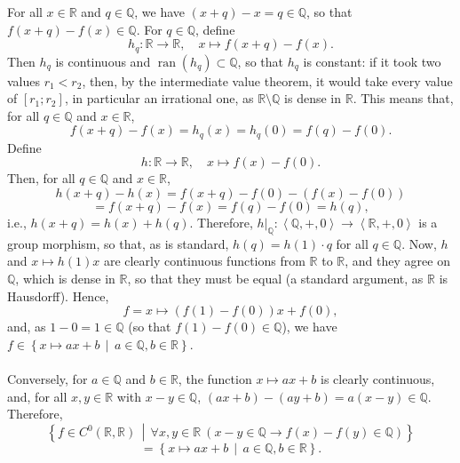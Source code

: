 \begin{solution}
    For all \( x \in \mathbb{R} \) and \( q \in \mathbb{Q} \), we have \( \left(x+q\right)-x = q \in \mathbb{Q} \), so that \( f\left(x+q\right)-f\left(x\right) \in \mathbb{Q} \). For \( q \in \mathbb{Q} \), define
    \[
        h_q \colon \mathbb{R} \longrightarrow \mathbb{R}, \quad x \longmapsto f\left(x+q\right)-f\left(x\right).
    \]
    Then \( h_q \) is continuous and \( \operatorname{ran}\left(h_q\right) \subset \mathbb{Q} \), so that \( h_q \) is constant: if it took two values \( r_1 < r_2 \), then, by the intermediate value theorem, it would take every value of \( \left[r_1;r_2\right] \), in particular an irrational one, as \( \mathbb{R} \setminus \mathbb{Q} \) is dense in \( \mathbb{R} \). This means that, for all \( q \in \mathbb{Q} \) and \( x \in \mathbb{R} \),
    \[
        f\left(x+q\right)-f\left(x\right) = h_q\left(x\right) = h_q\left(0\right) = f\left(q\right)-f\left(0\right).
    \]
    Define
    \[
        h \colon \mathbb{R} \longrightarrow \mathbb{R}, \quad x \longmapsto f\left(x\right)-f\left(0\right).
    \]
    Then, for all \( q \in \mathbb{Q} \) and \( x \in \mathbb{R} \),
    \[
        h\left(x+q\right)-h\left(x\right) = f\left(x+q\right)-f\left(0\right)-\left(f\left(x\right)-f\left(0\right)\right)
    \]
    \[
        = f\left(x+q\right)-f\left(x\right) = f\left(q\right)-f\left(0\right) = h\left(q\right),
    \]
    i.e., \( h\left(x+q\right) = h\left(x\right)+h\left(q\right) \). Therefore, \( h|_{\mathbb{Q}} \colon \left\langle \mathbb{Q},+,0 \right\rangle \longrightarrow \left\langle \mathbb{R},+,0 \right\rangle \) is a group morphism, so that, as is standard, \( h\left(q\right) = h\left(1\right) \cdot q \) for all \( q \in \mathbb{Q} \). Now, \( h \) and \( x \mapsto h\left(1\right)x \) are clearly continuous functions from \( \mathbb{R} \) to \( \mathbb{R} \), and they agree on \( \mathbb{Q} \), which is dense in \( \mathbb{R} \), so that they must be equal (a standard argument, as \( \mathbb{R} \) is Hausdorff). Hence,
    \[
        f = x \longmapsto \left(f\left(1\right)-f\left(0\right)\right)x+f\left(0\right),
    \]
    and, as \( 1-0 = 1 \in \mathbb{Q} \) (so that \( f\left(1\right)-f\left(0\right) \in \mathbb{Q} \)), we have \( f \in \left\{ x \mapsto ax+b \,\middle|\, a \in \mathbb{Q}, b \in \mathbb{R} \right\} \).
    \\\\
    Conversely, for \( a \in \mathbb{Q} \) and \( b \in \mathbb{R} \), the function \( x \mapsto ax+b \) is clearly continuous, and, for all \( x, y \in \mathbb{R} \) with \( x-y \in \mathbb{Q} \), \( \left(ax+b\right)-\left(ay+b\right) = a\left(x-y\right) \in \mathbb{Q} \). Therefore,
    \[
        \left\{ f \in C^0\left(\mathbb{R},\mathbb{R}\right) \,\middle|\, \forall x, y \in \mathbb{R} \ \left(x-y \in \mathbb{Q} \rightarrow f\left(x\right)-f\left(y\right) \in \mathbb{Q}\right) \right\}
    \]
    \[
        = \left\{ x \mapsto ax+b \,\middle|\, a \in \mathbb{Q}, b \in \mathbb{R} \right\}.
    \]
\end{solution}
